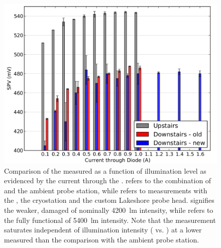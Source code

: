 \begin{figure}
\centering
	\includegraphics[width=0.8\linewidth]{./figs/chap2/currentseries}
	\caption{Comparison of the measured \spv{} as a function of illumination level as evidenced by the current through the \led{}.  refers to the combination of \led{} and the ambient probe station, while  refers to measurements with the \led{}, the \McA{} cryostation and the custom Lakeshore \kp{} probe head.  signifies the weaker, damaged \led{} of nominally \SI{4200}{\lumen} intensity, while  refers to the fully functional \led{} of \SI{5400}{\lumen} intensity. Note that the measurement saturates independent of illumination intensity ( vs. ) at a lower measured \spv{} than the comparison with the ambient probe station.}
	\label{fig:Iseries}
\end{figure}
